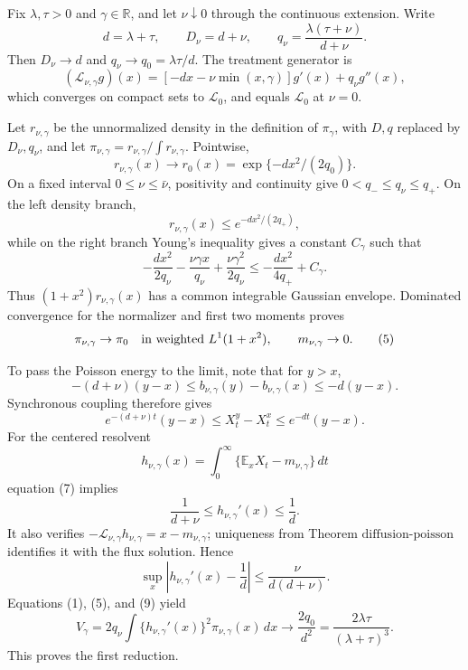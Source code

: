 Fix \(\lambda,\tau>0\) and \(\gamma\in\mathbb R\), and let \(\nu\downarrow0\) through the continuous extension.  Write
\[
 d=\lambda+\tau,
 \qquad D_\nu=d+\nu,
 \qquad q_\nu=\frac{\lambda(\tau+\nu)}{d+\nu}.                 \tag{1}
\]
Then \(D_\nu\to d\) and \(q_\nu\to q_0=\lambda\tau/d\).  The treatment generator is
\[
 (\mathcal L_{\nu,\gamma}g)(x)
 =[-dx-\nu\min(x,\gamma)]g'(x)+q_\nu g''(x),                  \tag{2}
\]
which converges on compact sets to \(\mathcal L_0\), and equals \(\mathcal L_0\) at \(\nu=0\).

Let \(r_{\nu,\gamma}\) be the unnormalized density in the definition of \(\pi_\gamma\), with \(D,q\) replaced by \(D_\nu,q_\nu\), and let \(\pi_{\nu,\gamma}=r_{\nu,\gamma}/\int r_{\nu,\gamma}\).  Pointwise,
\[
 r_{\nu,\gamma}(x)\longrightarrow
 r_0(x)=\exp\{-dx^2/(2q_0)\}.                                 \tag{3}
\]
On a fixed interval \(0\leq\nu\leq\bar\nu\), positivity and continuity give \(0<q_-\leq q_\nu\leq q_+\).  On the left density branch,
\[
 r_{\nu,\gamma}(x)\leq e^{-dx^2/(2q_+)},
\]
while on the right branch Young's inequality gives a constant \(C_\gamma\) such that
\[
 -\frac{dx^2}{2q_\nu}-\frac{\nu\gamma x}{q_\nu}
 +\frac{\nu\gamma^2}{2q_\nu}
 \leq-\frac{dx^2}{4q_+}+C_\gamma.                             \tag{4}
\]
Thus \((1+x^2)r_{\nu,\gamma}(x)\) has a common integrable Gaussian envelope.  Dominated convergence for the normalizer and first two moments proves
\[
 \pi_{\nu,\gamma}\to\pi_0
 \quad\hbox{in weighted }L^1(1+x^2),
 \qquad m_{\nu,\gamma}\to0.                                 \tag{5}
\]

To pass the Poisson energy to the limit, note that for \(y>x\),
\[
 -(d+\nu)(y-x)
 \leq b_{\nu,\gamma}(y)-b_{\nu,\gamma}(x)
 \leq-d(y-x).                                                  \tag{6}
\]
Synchronous coupling therefore gives
\[
 e^{-(d+\nu)t}(y-x)
 \leq X_t^y-X_t^x\leq e^{-dt}(y-x).                            \tag{7}
\]
For the centered resolvent
\[
 h_{\nu,\gamma}(x)=
 \int_0^\infty\{\mathbb E_xX_t-m_{\nu,\gamma}\}\,dt
\]
equation (7) implies
\[
 \frac1{d+\nu}\leq h_{\nu,\gamma}'(x)\leq\frac1d.           \tag{8}
\]
It also verifies \(-\mathcal L_{\nu,\gamma}h_{\nu,\gamma}=x-m_{\nu,\gamma}\); uniqueness from Theorem \(\mathrm{diffusion\mbox{-}poisson}\) identifies it with the flux solution.  Hence
\[
 \sup_x\left|h_{\nu,\gamma}'(x)-\frac1d\right|
 \leq\frac\nu{d(d+\nu)}.                                    \tag{9}
\]
Equations (1), (5), and (9) yield
\[
 V_\gamma
 =2q_\nu\int\{h_{\nu,\gamma}'(x)\}^2\pi_{\nu,\gamma}(x)\,dx
 \longrightarrow\frac{2q_0}{d^2}
 =\frac{2\lambda\tau}{(\lambda+\tau)^3}.                    \tag{10}
\]
This proves the first reduction.

